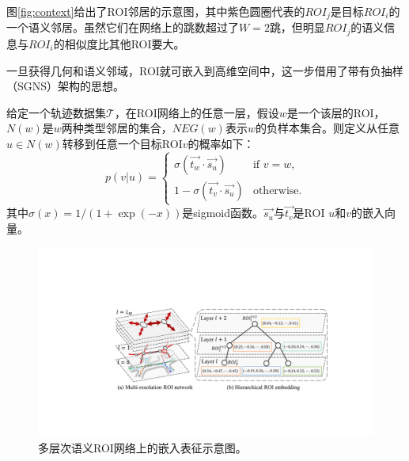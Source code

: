 图\ref{fig:context}给出了ROI邻居的示意图，其中紫色圆圈代表的${ROI}_j$是目标${ROI}_i$的一个语义邻居。虽然它们在网络上的跳数超过了$W=2$跳，但明显${ROI}_j$的语义信息与${ROI}_i$的相似度比其他ROI要大。

一旦获得几何和语义邻域，ROI就可嵌入到高维空间中，这一步借用了带有负抽样（SGNS）架构的思想。

给定一个轨迹数据集$\mathcal{T}$，在ROI网络上的任意一层，假设$w$是一个该层的ROI，$N(w)$是$w$两种类型邻居的集合，$NEG(w)$表示$w$的负样本集合。则定义从任意$u\in{N(w)}$转移到任意一个目标ROI$v$的概率如下：
\begin{equation}
\label{eq:transP}
p(v|u) =
\begin{cases}
\sigma(\vec{t_w}\cdot{}\vec{s_u}) & \text{if } v = w,\\
1- \sigma(\vec{t_v}\cdot{}\vec{s_u}) & \text{otherwise}.
\end{cases}
\end{equation}
其中$\sigma(x)=1/(1+\exp{(-x)})$是sigmoid函数。$\vec{s_u}$与$\vec{t_v}$是ROI $u$和$v$的嵌入向量。


\begin{figure}[!t]
\centering
\includegraphics[width=130mm]{pics/Hembedding.pdf}
\caption {多层次语义ROI网络上的嵌入表征示意图。}
\label{fig:Hembedding}
\end{figure}

